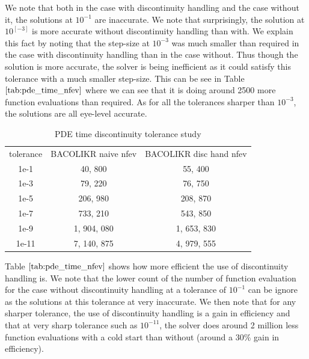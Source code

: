 \documentclass{article}
\begin{document}
We note that both in the case with discontinuity handling and the case without it, the solutions at $10^{-1}$ are inaccurate. We note that surprisingly, the solution at $10^[-3]$ is more accurate without discontinuity handling than with. We explain this fact by noting that the step-size at $10^{-3}$ was much smaller than required in the case with discontinuity handling than in the case without. Thus though the solution is more accurate, the solver is being inefficient as it could satisfy this tolerance with a much smaller step-size. This can be see in Table $\ref{tab:pde_time_nfev}$ where we can see that it is doing around 2500 more function evaluations than required. As for all the tolerances sharper than $10^{-3}$, the solutions are all eye-level accurate.

\begin{table}[h]
\caption {PDE time discontinuity tolerance study} 
\label{tab:pde_time_nfev}
\begin{center}
\begin{tabular}{ c c c  } 
tolerance & BACOLIKR naive nfev & BACOLIKR disc hand nfev \\ 
1e-1      &   40, 800           &   55, 400   \\
1e-3      &   79, 220           &  76, 750    \\
1e-5      &  206, 980           &  208, 870    \\
1e-7      &  733, 210           &  543, 850     \\
1e-9      & 1, 904, 080         & 1, 653, 830   \\
1e-11     & 7, 140, 875         & 4, 979, 555   \\
\end{tabular}
\end{center}
\end{table}

Table $\ref{tab:pde_time_nfev}$ shows how more efficient the use of discontinuity handling is. We note that the lower count of the number of function evaluation for the case without discontinuity handling at a tolerance of $10^{-1}$ can be ignore as the solutions at this tolerance at very inaccurate. We then note that for any sharper tolerance, the use of discontinuity handling is a gain in efficiency and that at very sharp tolerance such as $10^{-11}$, the solver does around 2 million less function evaluations with a cold start than without (around a $30\%$ gain in efficiency). 
\end{document}
